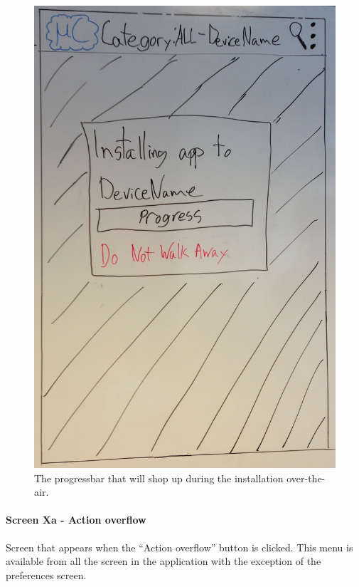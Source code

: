 \begin{figure}[H]
\centering
\includegraphics[scale=0.2]{images/Design_guide/Screen3a-ii.png}
\caption[Screen 3a-ii - Progress of installation]{The progressbar that will shop up during the installation over-the-air.}
\label{fig:screen3aii}
\end{figure}


\paragraph{Screen Xa - Action overflow}
Screen that appears when the ``Action overflow'' button is clicked. This menu is available from all the screen in the application with the exception of the preferences screen.

